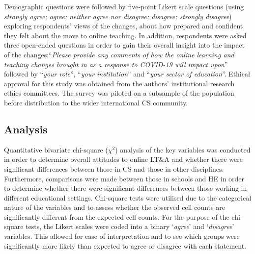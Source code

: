 \documentclass[conference]{IEEEtran}
\begin{document}
Demographic questions were followed by five-point Likert scale
questions (using {\emph{strongly agree; agree; neither agree nor
disagree; disagree; strongly disagree}}) exploring respondents' views
of the changes, about how prepared and confident they felt about the
move to online teaching. In addition, respondents were asked three
open-ended questions in order to gain their overall insight into the
impact of the changes:``{\emph{Please provide any comments of how the
online learning and teaching changes brought in as a response to
COVID-19 will impact upon}}'' followed by ``{\emph{your role}}'',
``{\emph{your institution}}'' and ``{\emph{your sector of
education}}''. Ethical approval for this study was obtained from the
authors' institutional research ethics committees. The survey was
piloted on a subsample of the population before distribution to the
wider international CS community.


\subsection{Analysis}


Quantitative bivariate chi-square ($\chi^2$) analysis of the key
variables was conducted in order to determine overall attitudes to
online LT\&A and whether there were significant differences between
those in CS and those in other disciplines. Furthermore,
comparisons were made between those in schools and HE in order to
determine whether there were significant differences between those
working in different educational settings. Chi-square tests were
utilised due to the categorical nature of the variables and to assess
whether the observed cell counts are significantly different from the
expected cell counts. For the purpose of the chi-square tests, the
Likert scales were coded into a binary `{\emph{agree}}' and
`{\emph{disagree}}' variables. This allowed for ease of interpretation
and to see which groups were significantly more likely than expected
to agree or disagree with each statement.
\end{document}
